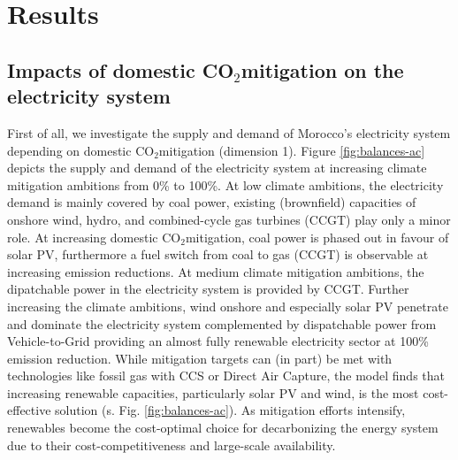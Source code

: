 \documentclass[5p,numafflabel]{elsarticle}
\newcommand{\co}{\ce{CO2}~}
\def\co{CO${}_2${\:}}
\begin{document}

% 



\section*{Results}
\label{sec:results}





\subsection*{Impacts of domestic \co mitigation on the electricity system}
\label{subsec:increase_limit}
First of all, we investigate the supply and demand of Morocco's electricity system depending on domestic \co mitigation (dimension 1). Figure \ref{fig:balances-ac} depicts the supply and demand of the electricity system at increasing climate mitigation ambitions from 0\% to 100\%. At low climate ambitions, the electricity demand is mainly covered by coal power, existing (brownfield) capacities of onshore wind, hydro, and combined-cycle gas turbines (CCGT) play only a minor role. 
At increasing domestic \co mitigation, coal power is phased out in favour of solar PV, furthermore a fuel switch from coal to gas (CCGT) is observable at increasing emission reductions. At medium climate mitigation ambitions, the dipatchable power in the electricity system is provided by CCGT. 
Further increasing the climate ambitions, wind onshore and especially solar PV penetrate and dominate the electricity system complemented by dispatchable power from Vehicle-to-Grid providing an almost fully renewable electricity sector at 100\% emission reduction. 
While mitigation targets can (in part) be met with technologies like fossil gas with CCS or Direct Air Capture, the model finds that increasing renewable capacities, particularly solar PV and wind, is the most cost-effective solution (s. Fig. \ref{fig:balances-ac}). As mitigation efforts intensify, renewables become the cost-optimal choice for decarbonizing the energy system due to their cost-competitiveness and large-scale availability.
\end{document}
